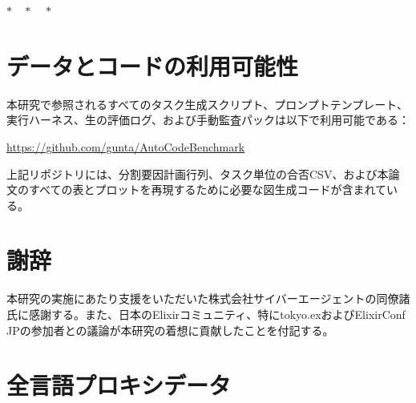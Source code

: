 \documentclass[11pt]{article}
\begin{document}
\bigskip
\begin{center}
$\ast\quad\ast\quad\ast$
\end{center}

\section*{データとコードの利用可能性}
本研究で参照されるすべてのタスク生成スクリプト、プロンプトテンプレート、実行ハーネス、生の評価ログ、および手動監査パックは以下で利用可能である：

\begin{center}
\url{https://github.com/gunta/AutoCodeBenchmark}
\end{center}

\noindent 上記リポジトリには、分割要因計画行列、タスク単位の合否CSV、および本論文のすべての表とプロットを再現するために必要な図生成コードが含まれている。

\section*{謝辞}

本研究の実施にあたり支援をいただいた株式会社サイバーエージェントの同僚諸氏に感謝する。また、日本のElixirコミュニティ、特にtokyo.exおよびElixirConf JPの参加者との議論が本研究の着想に貢献したことを付記する。

\clearpage
\appendix

\section{全言語プロキシデータ}
\label{app:proxy}
\end{document}
